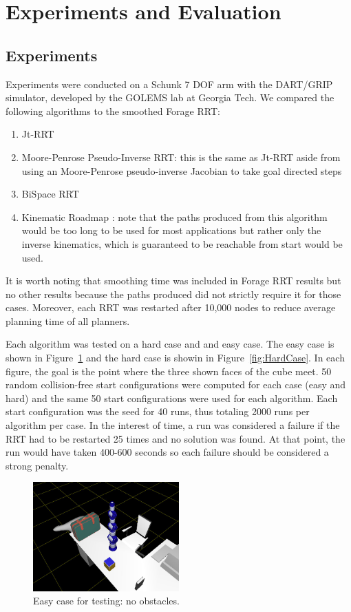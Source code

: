 \documentclass[conference]{IEEEtran}
\begin{document}
\section{Experiments and Evaluation}
\label{sec:evaluation}
\subsection{Experiments}
Experiments were conducted on a Schunk 7 DOF arm with the DART/GRIP simulator, developed by the GOLEMS lab at Georgia Tech. We compared the
following algorithms to the smoothed Forage RRT:
\begin{enumerate}
	\item Jt-RRT \cite{vande07}
	\item Moore-Penrose Pseudo-Inverse RRT: this is the same as Jt-RRT aside from using an Moore-Penrose pseudo-inverse Jacobian to take
	      goal directed steps
	\item BiSpace RRT \cite{diankov08}
	\item Kinematic Roadmap \cite{ahuactzin99}: note that the paths produced from this algorithm would be too long to be used for most
	      applications but rather only the inverse kinematics, which is guaranteed to be reachable from start would be used.
\end{enumerate}

It is worth noting that smoothing time was included in Forage RRT results but no other results because the paths produced did not strictly
require it for those cases. Moreover, each RRT was restarted after 10,000 nodes to reduce average planning time of all planners.

Each algorithm was tested on a hard case and and easy case. The easy case is shown in Figure~\ref{fig:EasyCase} and the hard case is showin
in Figure~\ref{fig:HardCase}. In each figure, the goal is the point where the three shown faces of the cube meet. 50 random collision-free
start configurations were computed for each case (easy and hard) and the same 50 start configurations were used for each algorithm. Each
start configuration was the seed for 40 runs, thus totaling 2000 runs per algorithm per case. In the interest of time, a run was considered
a failure if the RRT had to be restarted 25 times and no solution was found. At that point, the run would have taken 400-600 seconds so each
failure should be considered a strong penalty. 

\begin{figure}[h!]
  \centering
    \includegraphics[width=0.5\textwidth]{figures/EasyCase.jpg}
  \caption{Easy case for testing: no obstacles. \label{fig:EasyCase} }
\end{figure}
\end{document}
